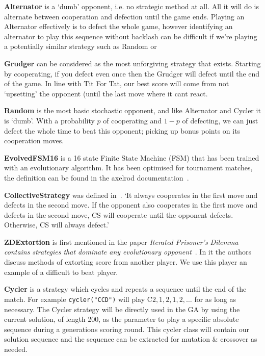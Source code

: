 \textbf{Alternator} is a `dumb' opponent, i.e. no strategic method at all. All it will do is alternate between cooperation and defection until the game ends. Playing an Alternator effectively is to defect the whole game, however identifying an alternator to play this sequence without backlash can be difficult if we're playing a potentially similar strategy such as Random or 

\textbf{Grudger} can be considered as the most unforgiving strategy that exists.
Starting by cooperating, if you defect even once then the Grudger will defect until the end of the game.
In line with Tit For Tat, our best score will come from not `upsetting' the opponent (until the last move where it cant react.

\textbf{Random} is the most basic stochastic opponent, and like Alternator and Cycler it is `dumb'. 
With a probability $p$ of cooperating and $1-p$ of defecting, we can just defect the whole time to beat this opponent; picking up bonus points on its cooperation moves.

\textbf{EvolvedFSM16} is a 16 state Finite State Machine (FSM) that has been trained with an evolutionary algorithm. It has been optimised for tournament matches, the definition can be found in the axelrod documentation~\cite{axelrodproject}.

\textbf{CollectiveStrategy} was defined in~\cite{li2009strategy}. ‘It always cooperates in the first move and defects in the second move. If the opponent also cooperates in the first move and defects in the second move, CS will cooperate until the opponent defects. Otherwise, CS will always defect.’

\textbf{ZDExtortion} is first mentioned in the paper \textit{Iterated Prisoner’s Dilemma contains strategies that dominate any evolutionary opponent}~\cite{press2012iterated}. In it the authors discuss methods of extorting score from another player. We use this player an example of a difficult to beat player.

\textbf{Cycler} is a strategy which cycles and repeats a sequence until the end of the match. 
For example \texttt{cycler("CCD")} will play C$2,1,2,1,2,\ldots$ for as long as necessary.
The Cycler strategy will be directly used in the GA by using the current solution, of length 200, as the parameter to play a specific absolute sequence during a generations scoring round.
This cycler class will contain our solution sequence and the sequence can be extracted for mutation \& crossover as needed.

